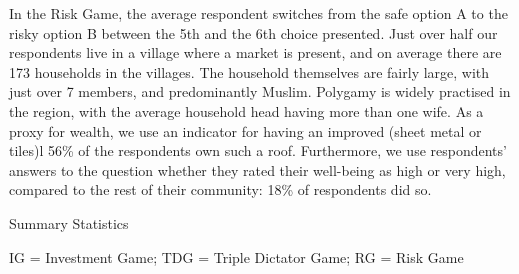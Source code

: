 In the Risk Game, the average respondent switches from the safe option A to the risky option B between the 5th and the 6th choice presented. Just over half our respondents live in a village where a market is present, and on average there are 173 households in the villages. The household themselves are fairly large, with just over 7 members, and predominantly Muslim. Polygamy is widely practised in the region, with the average household head having more than one wife. As a proxy for wealth, we use an indicator for having an improved (sheet metal or tiles)l 56\% of the respondents own such a roof. Furthermore, we use respondents' answers to the question whether they rated their well-being as high or very high, compared to the rest of their community: 18\% of respondents did so.



\begin{threeparttable}[htb]
	\caption{Summary Statistics}
	\label{tab:summ_stats}
	\centering
	
	\begin{tablenotes}
		\item IG = Investment Game; TDG = Triple Dictator Game; RG = Risk Game
		\item
	\end{tablenotes}

\end{threeparttable}




